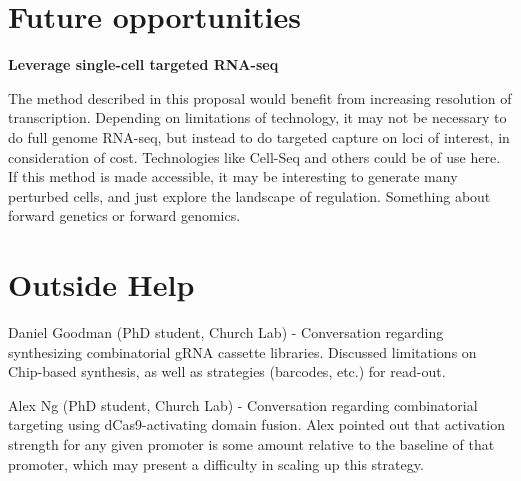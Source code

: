 \documentclass[10pt]{article}
\begin{document}
\section*{Future opportunities}

\textbf{Leverage single-cell targeted RNA-seq}

The method described in this proposal would benefit from increasing resolution of transcription. Depending on limitations of technology, it may not be necessary to do full genome RNA-seq, but instead to do targeted capture on loci of interest, in consideration of cost. Technologies like Cell-Seq and others could be of use here. If this method is made accessible, it may be interesting to generate many perturbed cells, and just explore the landscape of regulation. Something about forward genetics or forward genomics.

\pagebreak




\section*{Outside Help}

Daniel Goodman (PhD student, Church Lab) - Conversation regarding synthesizing combinatorial gRNA cassette libraries. Discussed limitations on Chip-based synthesis, as well as strategies (barcodes, etc.) for read-out.

Alex Ng (PhD student, Church Lab) - Conversation regarding combinatorial targeting using dCas9-activating domain fusion. Alex pointed out that activation strength for any given promoter is some amount relative to the baseline of that promoter, which may present a difficulty in scaling up this strategy.
\end{document}
